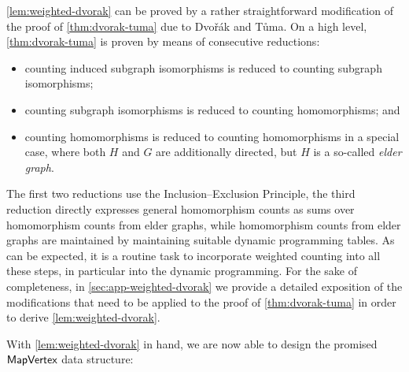 \cref{lem:weighted-dvorak} can be proved by a rather straightforward modification of the proof of \cref{thm:dvorak-tuma} due to Dvo\v{r}\'ak and T\r{u}ma.
On a high level, \cref{thm:dvorak-tuma} is proven by means of consecutive reductions:
\begin{itemize}
	\item counting induced subgraph isomorphisms is reduced to counting subgraph isomorphisms;
	\item counting subgraph isomorphisms is reduced to counting homomorphisms; and
	\item counting homomorphisms is reduced to counting homomorphisms in a special case, where both $H$ and $G$ are additionally directed, but $H$ is a so-called \textit{elder graph}.
\end{itemize}
The first two reductions use the Inclusion--Exclusion Principle, the third reduction directly expresses general homomorphism counts as sums over homomorphism counts from elder graphs, while homomorphism counts from elder graphs are maintained by maintaining suitable dynamic programming tables.
As can be expected, it is a routine task to incorporate weighted counting into all these steps, in particular into the dynamic programming. For the sake of completeness, in \cref{sec:app-weighted-dvorak} we provide a detailed exposition of the modifications that need to be applied to the proof of \cref{thm:dvorak-tuma} in order to derive  \cref{lem:weighted-dvorak}.

With \cref{lem:weighted-dvorak} in hand, we are now able to design the promised $\mathsf{MapVertex}$ data structure:

